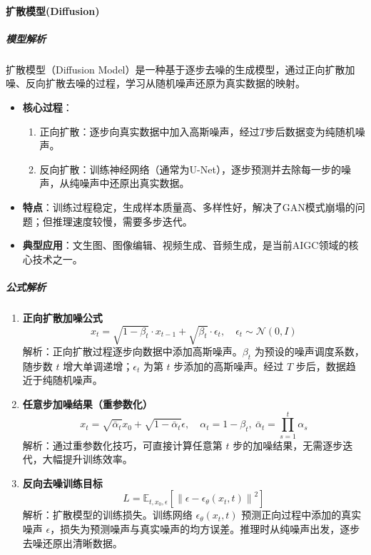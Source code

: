 \documentclass[12pt]{article}
\begin{document}
\paragraph{扩散模型(Diffusion)}
\subparagraph{模型解析}
扩散模型（Diffusion Model）是一种基于逐步去噪的生成模型，通过正向扩散加噪、反向扩散去噪的过程，学习从随机噪声还原为真实数据的映射。
\begin{itemize}
    \item \textbf{核心过程}：
    \begin{enumerate}
        \item 正向扩散：逐步向真实数据中加入高斯噪声，经过$T$步后数据变为纯随机噪声。
        \item 反向扩散：训练神经网络（通常为U-Net），逐步预测并去除每一步的噪声，从纯噪声中还原出真实数据。
    \end{enumerate}
    \item \textbf{特点}：训练过程稳定，生成样本质量高、多样性好，解决了GAN模式崩塌的问题；但推理速度较慢，需要多步迭代。
    \item \textbf{典型应用}：文生图、图像编辑、视频生成、音频生成，是当前AIGC领域的核心技术之一。
\end{itemize}

\subparagraph{公式解析}
\begin{enumerate}
    \item \textbf{正向扩散加噪公式}
    \[
    x_t = \sqrt{1-\beta_t} \cdot x_{t-1} + \sqrt{\beta_t} \cdot \epsilon_t,\quad \epsilon_t \sim \mathcal{N}(0,I)
    \]
    解析：正向扩散过程逐步向数据中添加高斯噪声。$\beta_t$ 为预设的噪声调度系数，随步数 $t$ 增大单调递增；$\epsilon_t$ 为第 $t$ 步添加的高斯噪声。经过 $T$ 步后，数据趋近于纯随机噪声。

    \item \textbf{任意步加噪结果（重参数化）}
    \[
    x_t = \sqrt{\bar{\alpha}_t} x_0 + \sqrt{1-\bar{\alpha}_t} \epsilon,\quad \alpha_t = 1-\beta_t,\ \bar{\alpha}_t = \prod_{s=1}^t \alpha_s
    \]
    解析：通过重参数化技巧，可直接计算任意第 $t$ 步的加噪结果，无需逐步迭代，大幅提升训练效率。

    \item \textbf{反向去噪训练目标}
    \[
    L = \mathbb{E}_{t, x_0, \epsilon} \left[ \left\| \epsilon - \epsilon_\theta(x_t, t) \right\|^2 \right]
    \]
    解析：扩散模型的训练损失。训练网络 $\epsilon_\theta(x_t, t)$ 预测正向过程中添加的真实噪声 $\epsilon$，损失为预测噪声与真实噪声的均方误差。推理时从纯噪声出发，逐步去噪还原出清晰数据。
\end{enumerate}
\end{document}
